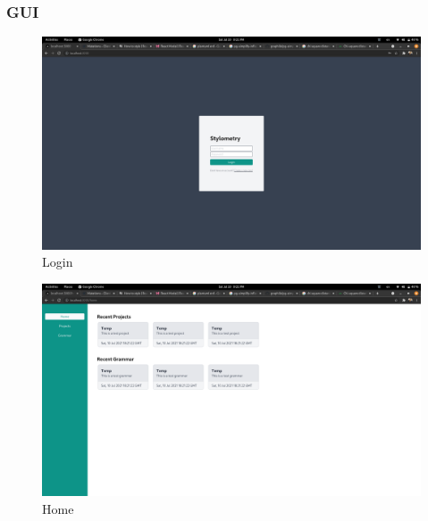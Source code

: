 \subsubsection {GUI}
\begin{figure}[H]
    \includegraphics[width=15cm]{images/Login.png}
    \caption{Login}
\end{figure}

\begin{figure}[H]
    \includegraphics[width=15cm]{images/Home.png}
    \caption{Home}
\end{figure}


